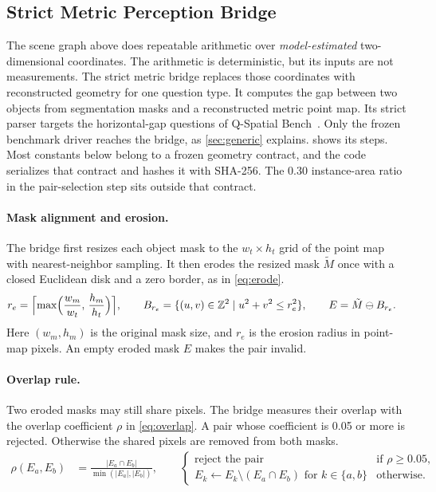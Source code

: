 \documentclass{article}
\begin{document}
\subsection{Strict Metric Perception Bridge}
\label{sec:bridge}

The scene graph above does repeatable arithmetic over \emph{model-estimated} two-dimensional coordinates. The arithmetic is deterministic, but its inputs are not measurements. The strict metric bridge replaces those coordinates with reconstructed geometry for one question type. It computes the gap between two objects from segmentation masks and a reconstructed metric point map. Its strict parser targets the horizontal-gap questions of Q-Spatial Bench~\citep{liao2024qspatial}. Only the frozen benchmark driver reaches the bridge, as \cref{sec:generic} explains.  shows its steps. Most constants below belong to a frozen geometry contract, and the code serializes that contract and hashes it with SHA-256. The 0.30 instance-area ratio in the pair-selection step sits outside that contract.



\paragraph{Mask alignment and erosion.}
The bridge first resizes each object mask to the $w_t \times h_t$ grid of the point map with nearest-neighbor sampling. It then erodes the resized mask $\tilde{M}$ once with a closed Euclidean disk and a zero border, as in \cref{eq:erode}.
\begin{align}
  r_e &= \Bigl\lceil \max\Bigl(\frac{w_m}{w_t},\, \frac{h_m}{h_t}\Bigr) \Bigr\rceil, \qquad
  B_{r_e} = \{(u, v) \in \mathbb{Z}^2 \mid u^2 + v^2 \le r_e^2\}, \qquad
  E = \tilde{M} \ominus B_{r_e}. \label{eq:erode}
\end{align}
Here $(w_m, h_m)$ is the original mask size, and $r_e$ is the erosion radius in point-map pixels. An empty eroded mask $E$ makes the pair invalid.

\paragraph{Overlap rule.}
Two eroded masks may still share pixels. The bridge measures their overlap with the overlap coefficient $\rho$ in \cref{eq:overlap}. A pair whose coefficient is 0.05 or more is rejected. Otherwise the shared pixels are removed from both masks.
\begin{align}
  \rho(E_a, E_b) &= \frac{\lvert E_a \cap E_b \rvert}{\min(\lvert E_a \rvert, \lvert E_b \rvert)}, \qquad
  \begin{cases}
    \text{reject the pair} & \text{if } \rho \ge 0.05,\\
    E_k \leftarrow E_k \setminus (E_a \cap E_b) \text{ for } k \in \{a, b\} & \text{otherwise.}
  \end{cases} \label{eq:overlap}
\end{align}
\end{document}

